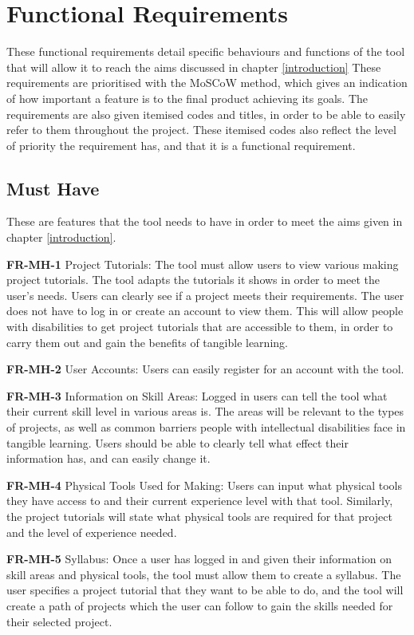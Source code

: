 \documentclass{l4proj}
\begin{document}
\section{Functional Requirements}
These functional requirements detail specific behaviours and functions of the tool that will allow it to reach the aims discussed in chapter \ref{introduction} These requirements are prioritised with the MoSCoW method, which gives an indication of how important a feature is to the final product achieving its goals. The requirements are also given itemised codes and titles, in order to be able to easily refer to them throughout the project. These itemised codes also reflect the level of priority the requirement has, and that it is a functional requirement. 

\subsection{Must Have}
These are features that the tool needs to have in order to meet the aims given in chapter \ref{introduction}. 

\textbf{FR-MH-1} Project Tutorials: The tool must allow users to view various making project tutorials. The tool adapts the tutorials it shows in order to meet the user's needs. Users can clearly see if a project meets their requirements. The user does not have to log in or create an account to view them. This will allow people with disabilities to get project tutorials that are accessible to them, in order to carry them out and gain the benefits of tangible learning. 

\textbf{FR-MH-2} User Accounts: Users can easily register for an account with the tool. 

\textbf{FR-MH-3} Information on Skill Areas: Logged in users can tell the tool what their current skill level in various areas is. The areas will be relevant to the types of projects, as well as common barriers people with intellectual disabilities face in tangible learning. Users should be able to clearly tell what effect their information has, and can easily change it. 

\textbf{FR-MH-4} Physical Tools Used for Making: Users can input what physical tools they have access to and their current experience level with that tool. Similarly, the project tutorials will state what physical tools are required for that project and the level of experience needed. 

\textbf{FR-MH-5} Syllabus: Once a user has logged in and given their information on skill areas and physical tools, the tool must allow them to create a syllabus. The user specifies a project tutorial that they want to be able to do, and the tool will create a path of projects which the user can follow to gain the skills needed for their selected project. \\
\end{document}
